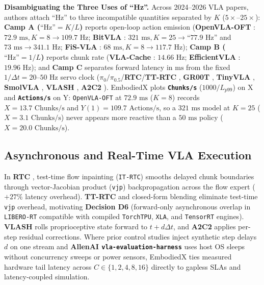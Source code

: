 \documentclass[10pt,letterpaper]{article}
\begin{document}
\textbf{Disambiguating the Three Uses of ``Hz''.} Across 2024--2026 VLA papers, authors attach ``Hz'' to three incompatible quantities separated by $K$ ($5\times\text{--}25\times$): \textbf{Camp A ($\text{``Hz''} = K/L$)} reports open-loop action emission (\textbf{OpenVLA-OFT} \cite{Kim2025finetuning}: $72.9\text{ ms}, K{=}8 \to 109.7\text{ Hz}$; \textbf{BitVLA} \cite{Wang2025bitvla}: $321\text{ ms}, K{=}25 \to \text{``}77.9\text{ Hz''}$ and $73\text{ ms} \to 341.1\text{ Hz}$; \textbf{FiS-VLA} \cite{Chen2025fisvla}: $68\text{ ms}, K{=}8 \to 117.7\text{ Hz}$); \textbf{Camp B ($\text{``Hz''} = 1/L$)} reports chunk rate (\textbf{VLA-Cache} \cite{Xu2025vlacache}: $14.66\text{ Hz}$; \textbf{EfficientVLA} \cite{Yang2025efficientvla}: $19.96\text{ Hz}$); and \textbf{Camp C} separates forward latency in $\text{ms}$ from the fixed $1/\Delta t = 20\text{--}50\text{ Hz}$ servo clock ($\pi_0/\pi_{0.5}$/\textbf{RTC}/\textbf{TT-RTC} \cite{Black2024pi0,PhysicalIntelligence2025pi05,Black2025realtime,Black2025trainingtime}, \textbf{GR00T} \cite{Bjorck2025gr00t}, \textbf{TinyVLA} \cite{Wen2024tinyvla}, \textbf{SmolVLA} \cite{Shukor2025smolvla}, \textbf{VLASH} \cite{Tang2025vlash}, \textbf{A2C2} \cite{Sendai2025a2c2}). EmbodiedX plots \textbf{\texttt{Chunks/s}} ($1000/L_{p99}$) on X and \textbf{\texttt{Actions/s}} on Y: \texttt{OpenVLA-OFT} at $72.9\text{ ms}$ ($K{=}8$) records $X = 13.7\text{ Chunks/s}$ and $Y(1) = 109.7\text{ Actions/s}$, so a $321\text{ ms}$ model at $K{=}25$ ($X = 3.1\text{ Chunks/s}$) never appears more reactive than a $50\text{ ms}$ policy ($X = 20.0\text{ Chunks/s}$).

\subsection{Asynchronous and Real-Time VLA Execution}
In \textbf{RTC} \cite{Black2025realtime}, test-time flow inpainting (\texttt{IT-RTC}) smooths delayed chunk boundaries through vector-Jacobian product (\texttt{vjp}) backpropagation across the flow expert ($+27\%$ latency overhead). \textbf{TT-RTC} \cite{Black2025trainingtime} and closed-form blending eliminate test-time \texttt{vjp} overhead, motivating \textbf{Decision D6} (forward-only asynchronous overlap in \texttt{LIBERO-RT} compatible with compiled \texttt{TorchTPU}, \texttt{XLA}, and \texttt{TensorRT} engines). \textbf{VLASH} \cite{Tang2025vlash} rolls proprioceptive state forward to $t + d\Delta t$, and \textbf{A2C2} \cite{Sendai2025a2c2} applies per-step residual corrections. Where prior control studies inject synthetic step delays $d$ on one stream and \textbf{AllenAI \texttt{vla-evaluation-harness}} \cite{AllenAI2026vlaeval} uses host OS sleeps without concurrency sweeps or power sensors, EmbodiedX ties measured hardware tail latency across $C \in \{1, 2, 4, 8, 16\}$ directly to gapless SLAs and latency-coupled simulation.
\end{document}

